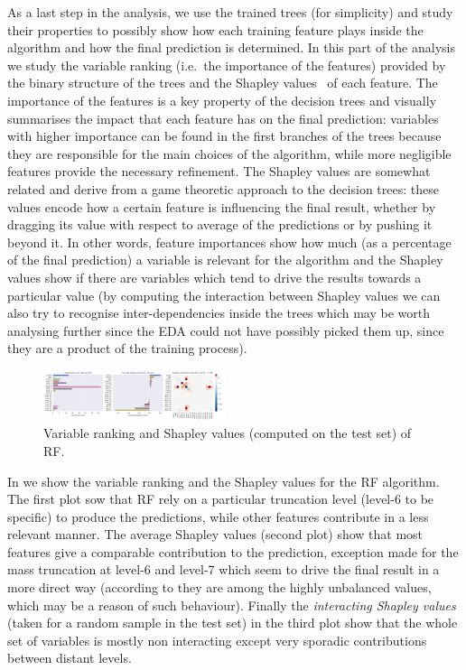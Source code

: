 As a last step in the analysis, we use the trained trees (for simplicity) and
study their properties to possibly show how each training feature plays inside
the algorithm and how the final prediction is determined.
In this part of the analysis we study the variable ranking (i.e.\ the
importance of the features) provided by the binary structure of the trees and
the Shapley values~\cite{Lundberg:2017:Shap,Lundberg:2020:TreeExp} of each
feature.
The importance of the features is a key property of the decision trees and
visually summarises the impact that each feature has on the final prediction:
variables with higher importance can be found in the first branches of the
trees because they are responsible for the main choices of the algorithm, while
more negligible features provide the necessary refinement.
The Shapley values are somewhat related and derive from a game theoretic
approach to the decision trees: these values encode how a certain feature is
influencing the final result, whether by dragging its value with respect to
average of the predictions or by pushing it beyond it.
In other words, feature importances show how much (as a percentage of the final
prediction) a variable is relevant for the algorithm and the Shapley values
show if there are variables which tend to drive the results towards a
particular value (by computing the interaction between Shapley values we can
also try to recognise inter-dependencies inside the trees which may be worth
analysing further since the EDA could not have possibly picked them up, since
they are a product of the training process).

\begin{figure}[htbp]
  \centering
  \includegraphics[width=0.475\textwidth]{img/rnd_for_shapley}
  \caption{Variable ranking and Shapley values (computed on the test set) of
  RF.}
  \label{fig:ml:rnd_for_shap}
\end{figure}

In  we show the variable ranking and the Shapley
values for the RF algorithm.
The first plot sow that RF rely on a particular truncation level (level-6 to be
specific) to produce the predictions, while other features contribute in a less
relevant manner.
The average Shapley values (second plot) show that most features give a
comparable contribution to the prediction, exception made for the mass
truncation at level-6 and level-7 which seem to drive the final result in a
more direct way (according to  they are among the
highly unbalanced values, which may be a reason of such behaviour).
Finally the \textit{interacting Shapley values} (taken for a random sample in
the test set) in the third plot show that the whole set of variables is mostly
non interacting except very sporadic contributions between distant levels.

